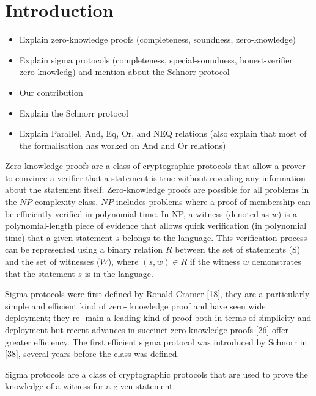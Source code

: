 \documentclass[sigconf]{acmart}
\begin{document}
\maketitle

\section{Introduction}
\begin{itemize}
  \item Explain zero-knowledge proofs (completeness, soundness, zero-knowledge)
  \item Explain sigma protocols (completeness, special-soundness, honest-verifier zero-knowledg) 
  and mention about the Schnorr protocol
  \item Our contribution
  \item Explain the Schnorr protocol
  \item Explain Parallel, And, Eq, Or, and NEQ relations (also explain that 
  most of the formalisation has worked on And and Or relations)
\end{itemize}
Zero-knowledge proofs are a class of cryptographic protocols that allow a
prover to convince a verifier that a statement is true without revealing 
any information about the statement itself. 
Zero-knowledge proofs are possible for all problems in the $NP$ complexity class. 
$NP$ includes problems where a proof of membership can be efficiently 
verified in polynomial time. In NP, a witness (denoted as $w$) is a 
polynomial-length piece of evidence that allows quick
verification (in polynomial time) that a given statement $s$ 
belongs to the language. This verification process can be represented 
using a binary relation $R$ between the set of statements (S) and the 
set of witnesses ($W$), where $(s, w) \in R$ if the witness $w$ 
demonstrates that the statement $s$ is in the language. 

Sigma protocols were first defined by Ronald Cramer [18],
they are a particularly simple and efficient kind of zero-
knowledge proof and have seen wide deployment; they re-
main a leading kind of proof both in terms of simplicity and
deployment but recent advances in succinct zero-knowledge
proofs [26] offer greater efficiency. The first efficient sigma
protocol was introduced by Schnorr in [38], several years
before the class was defined.

Sigma protocols are a class of cryptographic protocols that are used to prove the 
knowledge of a witness for a given statement. 
\end{document}
